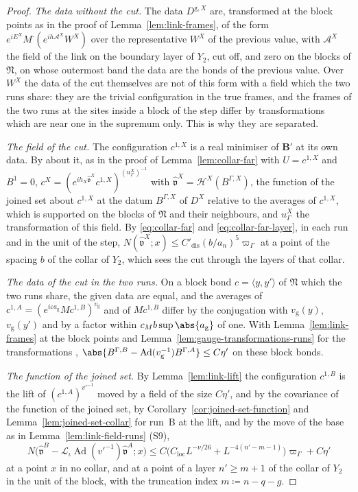\begin{proof}
\emph{The data without the cut.} The data $D^{\mathrm g,X}$ are, transformed at the block points as in the proof of Lemma~\ref{lem:link-frames}, of the form $e^{iE^X}M^\cdot(e^{ih\mathcal A^X}W^X)$ over the representative $W^X$ of the previous value, with $\mathcal A^X$ the field of the link on the boundary layer of $Y_2$, cut off, and zero on the blocks of $\mathfrak N$, on whose outermost band the data are the bonds of the previous value. Over $W^X$ the data of the cut themselves are not of this form with a field which the two runs share: they are the trivial configuration in the true frames, and the frames of the two runs at the sites inside a block of the step differ by transformations which are near one in the supremum only. This is why they are separated.

\emph{The field of the cut.} The configuration $c^{1,X}$ is a real minimiser of $\mathbf B'$ at its own data. By \cite[Proposition~9]{BalabanVAR} about it, as in the proof of Lemma~\ref{lem:collar-far} with $U = c^{1,X}$ and $B^1 = 0$, $c^X = (e^{ih_X\hat{\mathfrak v}^X}c^{1,X})^{(u^X_\Gamma)^{-1}}$ with $\hat{\mathfrak v}^X = \mathscr H^X(B^{\Gamma,X})$, the function of the joined set about $c^{1,X}$ at the datum $B^{\Gamma,X}$ of $D^X$ relative to the averages of $c^{1,X}$, which is supported on the blocks of $\mathfrak N$ and their neighbours, and $u^X_\Gamma$ the transformation \cite[(106)]{BalabanAVG} of this field. By \eqref{eq:collar-far} and \eqref{eq:collar-far-layer}, in each run and in the unit of the step, $N(\hat{\mathfrak v}^X; x) \leq C'_{\mathrm{dis}}(b/a_n)^5\varpi_\Gamma$ at a point of the spacing $b$ of the collar of $Y_2$, which sees the cut through the layers of that collar.

\emph{The data of the cut in the two runs.} On a block bond $c = \langle y, y'\rangle$ of $\mathfrak N$ which the two runs share, the given data are equal, and the averages of $c^{1,A} = (e^{i\varepsilon a_{\mathrm g}}Mc^{1,B})^{v_{\mathrm g}}$ and of $Mc^{1,B}$ differ by the conjugation with $v_{\mathrm g}(y)$, $v_{\mathrm g}(y')$ and by a factor within $c_Mb\sup\abs{a_{\mathrm g}}$ of one. With Lemma~\ref{lem:link-frames} at the block points and Lemma~\ref{lem:gauge-transformations-runs} for the transformations \cite[(106)]{BalabanAVG}, $\abs{B^{\Gamma,B} - \operatorname{Ad}(v_{\mathrm g}^{-1})B^{\Gamma,A}} \leq C\eta'$ on these block bonds.

\emph{The function of the joined set.} By Lemma~\ref{lem:link-lift} the configuration $c^{1,B}$ is the lift of $(c^{1,A})^{v'^{-1}}$ moved by a field of the size $C\eta'$, and by the covariance of the function of the joined set, by Corollary~\ref{cor:joined-set-function} and Lemma~\ref{lem:joined-set-collar} for run~B at the lift, and by the move of the base as in Lemma~\ref{lem:link-field-runs} (S9),
\[
    N\bigl(\hat{\mathfrak v}^B - \mathcal L_\iota\operatorname{Ad}(v'^{-1})\hat{\mathfrak v}^A; x\bigr) \leq C\bigl(C_{\mathrm{loc}}L^{-\nu/26} + L^{-4(n'-m-1)}\bigr)\varpi_\Gamma + C\eta'
\]
at a point $x$ in no collar, and at a point of a layer $n' \geq m + 1$ of the collar of $Y_2$ in the unit of the block, with the truncation index $m \coloneqq n - q - g$.


\end{proof}

